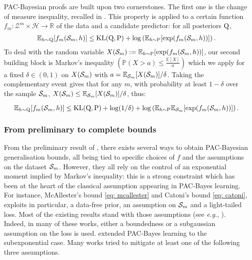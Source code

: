 PAC-Bayesian proofs are built upon two cornerstones. The first one is the change of measure inequality, recalled in .
This property is applied to a certain function $f_m: \mathcal{Z}^m \times \mathcal{H}\rightarrow \mathbb{R}$ of the data and a candidate predictor: for all posteriors $\mathrm{Q}$,
\begin{align}
\label{eq: change_meas_pacb-chap-2}
\mathbb{E}_{h\sim \mathrm{Q}}[f_m(\mathcal{S}_m,h)] \leq \mathrm{KL}(\mathrm{Q},\mathrm{P}) + \log\left( \mathbb{E}_{h\sim \mathrm{P}}[\exp(f_m(\mathcal{S}_m,h))]  \right).
\end{align}
To deal with the random variable  $X(\mathcal{S}_m):=\mathbb{E}_{h\sim \mathrm{P}}[\exp(f_m(\mathcal{S}_m,h))] $, our second building block is Markov's inequality $\left(\mathbb{P}(X>a) \leq \frac{\mathbb{E}[X]}{a}\right)$ which we apply for a fixed $\delta\in (0,1)$ on $X(\mathcal{S}_m)$ with $a= \mathbb{E}_{\mathcal{S}_m}[X(\mathcal{S}_m)]/\delta$.
Taking the complementary event gives that for any $m$, with probability at least $1-\delta$ over the sample $\mathcal{S}_m$, $X(\mathcal{S}_m)\leq \mathbb{E}_{\mathcal{S}_m}[X(\mathcal{S}_m)]/\delta$, thus:



\begin{equation}
  \label{eq: prelim_pb_bound-chap-2}
  \mathbb{E}_{h\sim \mathrm{Q}}[f_m(\mathcal{S}_m,h)] \leq \operatorname{KL}(\mathrm{Q},\mathrm{P}) + \log(1/\delta) + \log\left( \mathbb{E}_{h\sim \mathrm{P}}\mathbb{E}_{\mathcal{S}_m}[\exp(f_m(\mathcal{S}_m,h))]  \right).
\end{equation}

\subsubsection{From preliminary to complete bounds}


From the preliminary result of , there exists several ways to obtain PAC-Bayesian generalisation bounds, all being tied to specific choices of $f$ and the assumptions on the dataset $\mathcal{S}_m$. However, they all rely on the control of an exponential moment implied by Markov's inequality: this is a strong constraint which has been at the heart of the classical assumption appearing in PAC-Bayes learning.
For instance, McAllester's bound \eqref{eq: mcallester} and Catoni's bound \eqref{eq: catoni}, exploits in particular, a data-free prior, an \iid assumption on $\mathcal{S}_m$ and a light-tailed loss. Most of the existing results stand with those assumptions (see \emph{e.g.}, \citealp{catoni2007pac,germain2009pac,guedj2013pac,tolstikhin2013pac,guedj2018pac,mhammedi2019pac,wu2022split}).
Indeed, in many of these works, either a boundedness or a subgaussian assumption on the loss is used.  \citet{catoni2004statistical} extended PAC-Bayes learning to the subexponential case. Many works tried to mitigate at least one of the following three assumptions.

